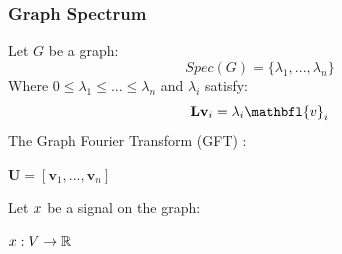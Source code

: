 \documentclass[11pts]{beamer}
\begin{document}
\begin{frame}%
\frametitle{Graph Spectrum}

\begin{minipage}{0.5\textwidth}

Let $G$ be a graph:
\begin{equation*}
    Spec(G)=\{\lambda_{1},...,\lambda_{n}\}
\end{equation*}
Where $0\leq \lambda_{1}\leq...\leq \lambda_{n}$ and $\lambda_{i}$ satisfy:
\begin{equation*}
    \mathbf{L}\mathbf{v}_{i}=\lambda_{i} \mathbfl{v}_{i}
\end{equation*}
The Graph Fourier Transform (GFT) :
\vspace*{-0.25cm}
\begin{center}
    $\mathbf{U}=[\mathbf{v}_{1},...,\mathbf{v}_{n}]$
\end{center}
Let $\mathnormal{x}$  be a signal on the graph:
\begin{center}
    $\mathnormal{x}: V\rightarrow \mathbb{R}$ 
\end{center}



\end{minipage}
\end{frame}
\end{document}
